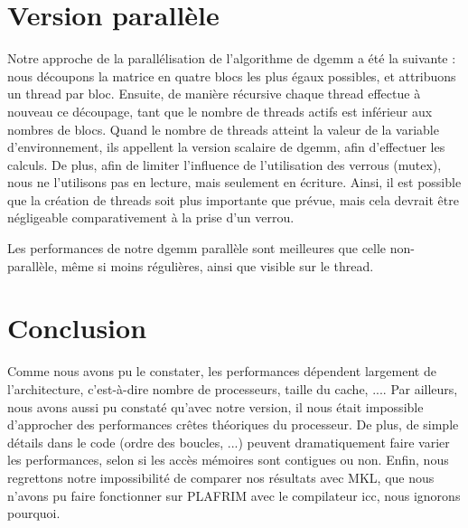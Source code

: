\documentclass[a4paper,11pt]{article}
\begin{document}
\section{Version parallèle}
Notre approche de la parallélisation de l'algorithme de dgemm a été la suivante : nous découpons la matrice en quatre blocs les plus égaux possibles, et attribuons un thread par bloc.
Ensuite, de manière récursive chaque thread effectue à nouveau ce découpage, tant que le nombre de threads actifs est inférieur aux nombres de blocs. 
Quand le nombre de threads atteint la valeur de la variable d'environnement, ils appellent la version scalaire de dgemm, afin d'effectuer les calculs.
De plus, afin de limiter l'influence de l'utilisation des verrous (mutex), nous ne l'utilisons pas en lecture, mais seulement en écriture. 
Ainsi, il est possible que la création de threads soit plus importante que prévue, mais cela devrait être négligeable comparativement à la prise d'un verrou.

Les performances de notre dgemm parallèle sont meilleures que celle non-parallèle, même si moins régulières, ainsi que visible sur le thread.
\section{Conclusion}

Comme nous avons pu le constater, les performances dépendent largement de l'architecture, c'est-à-dire nombre de processeurs, taille du cache, .... 
Par ailleurs, nous avons aussi pu constaté qu'avec notre version, il nous était impossible d'approcher des performances crêtes théoriques du processeur. 
De plus, de simple détails dans le code (ordre des boucles, ...) peuvent dramatiquement faire varier les performances, selon si les accès mémoires sont contigues ou non.
Enfin, nous regrettons notre impossibilité de comparer nos résultats avec MKL, que nous n'avons pu faire fonctionner sur PLAFRIM avec le compilateur icc, nous ignorons pourquoi.
\end{document}
